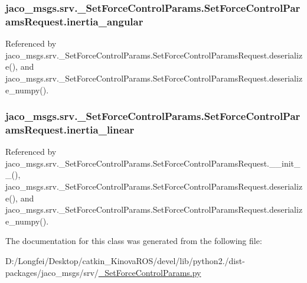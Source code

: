 \subsubsection[{\texorpdfstring{inertia\+\_\+angular}{inertia_angular}}]{\setlength{\rightskip}{0pt plus 5cm}jaco\+\_\+msgs.\+srv.\+\_\+\+Set\+Force\+Control\+Params.\+Set\+Force\+Control\+Params\+Request.\+inertia\+\_\+angular}\hypertarget{classjaco__msgs_1_1srv_1_1__SetForceControlParams_1_1SetForceControlParamsRequest_a4ffea018c8ffc3cf44cdd7d68c4ca918}{}\label{classjaco__msgs_1_1srv_1_1__SetForceControlParams_1_1SetForceControlParamsRequest_a4ffea018c8ffc3cf44cdd7d68c4ca918}


Referenced by jaco\+\_\+msgs.\+srv.\+\_\+\+Set\+Force\+Control\+Params.\+Set\+Force\+Control\+Params\+Request.\+deserialize(), and jaco\+\_\+msgs.\+srv.\+\_\+\+Set\+Force\+Control\+Params.\+Set\+Force\+Control\+Params\+Request.\+deserialize\+\_\+numpy().

\subsubsection[{\texorpdfstring{inertia\+\_\+linear}{inertia_linear}}]{\setlength{\rightskip}{0pt plus 5cm}jaco\+\_\+msgs.\+srv.\+\_\+\+Set\+Force\+Control\+Params.\+Set\+Force\+Control\+Params\+Request.\+inertia\+\_\+linear}\hypertarget{classjaco__msgs_1_1srv_1_1__SetForceControlParams_1_1SetForceControlParamsRequest_ab5cf9f4019e6c446ca473ca2a38492ad}{}\label{classjaco__msgs_1_1srv_1_1__SetForceControlParams_1_1SetForceControlParamsRequest_ab5cf9f4019e6c446ca473ca2a38492ad}


Referenced by jaco\+\_\+msgs.\+srv.\+\_\+\+Set\+Force\+Control\+Params.\+Set\+Force\+Control\+Params\+Request.\+\_\+\+\_\+init\+\_\+\+\_\+(), jaco\+\_\+msgs.\+srv.\+\_\+\+Set\+Force\+Control\+Params.\+Set\+Force\+Control\+Params\+Request.\+deserialize(), and jaco\+\_\+msgs.\+srv.\+\_\+\+Set\+Force\+Control\+Params.\+Set\+Force\+Control\+Params\+Request.\+deserialize\+\_\+numpy().



The documentation for this class was generated from the following file\+:\begin{DoxyCompactItemize}
\item 
D\+:/\+Longfei/\+Desktop/catkin\+\_\+\+Kinova\+R\+O\+S/devel/lib/python2./dist-\/packages/jaco\+\_\+msgs/srv/\hyperlink{__SetForceControlParams_8py}{\+\_\+\+Set\+Force\+Control\+Params.\+py}\end{DoxyCompactItemize}
